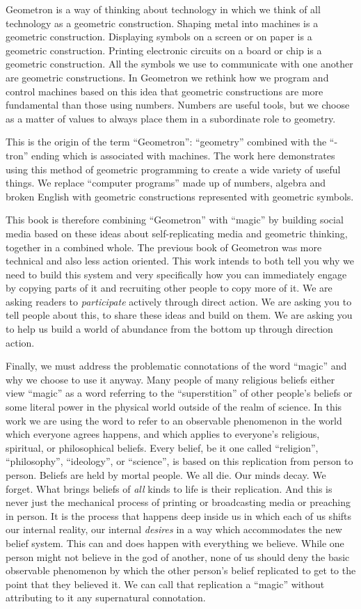 Geometron is a way of thinking about technology in which we think of all
technology as a geometric construction. Shaping metal into machines is a
geometric construction. Displaying symbols on a screen or on paper is a
geometric construction. Printing electronic circuits on a board or chip
is a geometric construction. All the symbols we use to communicate with
one another are geometric constructions. In Geometron we rethink how we
program and control machines based on this idea that geometric
constructions are more fundamental than those using numbers. Numbers are
useful tools, but we choose as a matter of values to always place them
in a subordinate role to geometry.

This is the origin of the term ``Geometron'': ``geometry'' combined with
the ``-tron'' ending which is associated with machines. The work here
demonstrates using this method of geometric programming to create a wide
variety of useful things. We replace ``computer programs'' made up of
numbers, algebra and broken English with geometric constructions
represented with geometric symbols.

This book is therefore combining ``Geometron'' with ``magic'' by
building social media based on these ideas about self-replicating media
and geometric thinking, together in a combined whole. The previous book
of Geometron was more technical and also less action oriented. This work
intends to both tell you why we need to build this system and very
specifically how you can immediately engage by copying parts of it and
recruiting other people to copy more of it. We are asking readers to
\emph{participate} actively through direct action. We are asking you to
tell people about this, to share these ideas and build on them. We are
asking you to help us build a world of abundance from the bottom up
through direction action.

Finally, we must address the problematic connotations of the word
``magic'' and why we choose to use it anyway. Many people of many
religious beliefs either view ``magic'' as a word referring to the
``superstition'' of other people's beliefs or some literal power in the
physical world outside of the realm of science. In this work we are
using the word to refer to an observable phenomenon in the world which
everyone agrees happens, and which applies to everyone's religious,
spiritual, or philosophical beliefs. Every belief, be it one called
``religion'', ``philosophy'', ``ideology'', or ``science'', is based on
this replication from person to person. Beliefs are held by mortal
people. We all die. Our minds decay. We forget. What brings beliefs of
\emph{all} kinds to life is their replication. And this is never just
the mechanical process of printing or broadcasting media or preaching in
person. It is the process that happens deep inside us in which each of
us shifts our internal reality, our internal \emph{desires} in a way
which accommodates the new belief system. This can and does happen with
everything we believe. While one person might not believe in the god of
another, none of us should deny the basic observable phenomenon by which
the other person's belief replicated to get to the point that they
believed it. We can call that replication a ``magic'' without
attributing to it any supernatural connotation.


